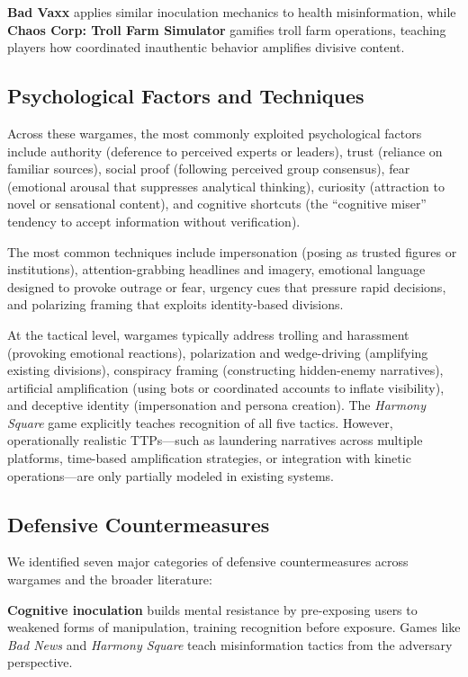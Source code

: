 \documentclass[12pt]{article}
\begin{document}
\textbf{Bad Vaxx} applies similar inoculation mechanics to health misinformation, while \textbf{Chaos Corp: Troll Farm Simulator} gamifies troll farm operations, teaching players how coordinated inauthentic behavior amplifies divisive content.

\subsection{Psychological Factors and Techniques}

Across these wargames, the most commonly exploited psychological factors include authority (deference to perceived experts or leaders), trust (reliance on familiar sources), social proof (following perceived group consensus), fear (emotional arousal that suppresses analytical thinking), curiosity (attraction to novel or sensational content), and cognitive shortcuts (the ``cognitive miser'' tendency to accept information without verification).

The most common techniques include impersonation (posing as trusted figures or institutions), attention-grabbing headlines and imagery, emotional language designed to provoke outrage or fear, urgency cues that pressure rapid decisions, and polarizing framing that exploits identity-based divisions.

At the tactical level, wargames typically address trolling and harassment (provoking emotional reactions), polarization and wedge-driving (amplifying existing divisions), conspiracy framing (constructing hidden-enemy narratives), artificial amplification (using bots or coordinated accounts to inflate visibility), and deceptive identity (impersonation and persona creation). The \textit{Harmony Square} game explicitly teaches recognition of all five tactics. However, operationally realistic TTPs---such as laundering narratives across multiple platforms, time-based amplification strategies, or integration with kinetic operations---are only partially modeled in existing systems.

\subsection{Defensive Countermeasures}

We identified seven major categories of defensive countermeasures across wargames and the broader literature:

\textbf{Cognitive inoculation} builds mental resistance by pre-exposing users to weakened forms of manipulation, training recognition before exposure. Games like \textit{Bad News} and \textit{Harmony Square} teach misinformation tactics from the adversary perspective.
\end{document}
